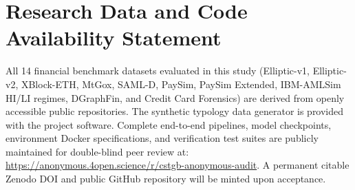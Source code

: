 \documentclass[a4paper,11pt]{article}
\begin{document}
\section*{Research Data and Code Availability Statement}
All 14 financial benchmark datasets evaluated in this study (Elliptic-v1, Elliptic-v2, XBlock-ETH, MtGox, SAML-D, PaySim, PaySim Extended, IBM-AMLSim HI/LI regimes, DGraphFin, and Credit Card Forensics) are derived from openly accessible public repositories. The synthetic typology data generator is provided with the project software. Complete end-to-end pipelines, model checkpoints, environment Docker specifications, and verification test suites are publicly maintained for double-blind peer review at: \url{https://anonymous.4open.science/r/cstgb-anonymous-audit}. A permanent citable Zenodo DOI and public GitHub repository will be minted upon acceptance.
\end{document}
